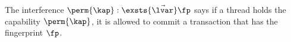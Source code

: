 

The interference \( \perm{\kap} : \exsts{\vec{\lvar}} \fp \) says if a thread holds the capability \( \perm{\kap} \), it is allowed to commit a transaction that has the fingerprint \( \fp \).

